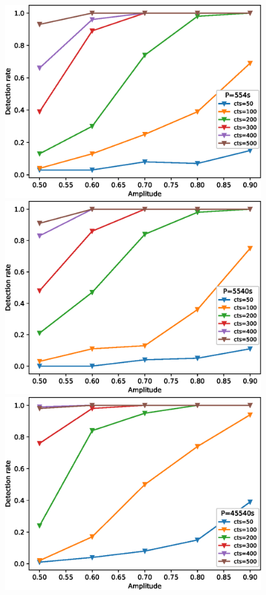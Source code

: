 \documentclass[fleqn,usenatbib]{mnras}
\begin{document}
\begin{figure}
\begin{minipage}[b]{0.45\textwidth}
\includegraphics[width=\textwidth]{./figure/sim_LW/detection_554.eps}
\includegraphics[width=\textwidth]{./figure/sim_LW/detection_5540.eps}
\includegraphics[width=\textwidth]{./figure/sim_LW/detection_45540.eps}

\end{minipage}
\end{figure}
\end{document}

